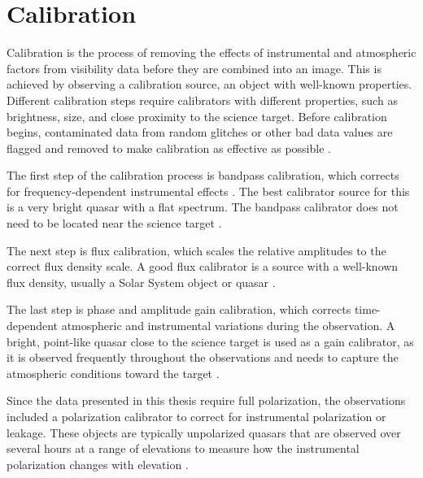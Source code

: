 


\section{Calibration}

Calibration is the process of removing the effects of instrumental and atmospheric factors from visibility data before they are combined into an image. This is achieved by observing a calibration source, an object with well-known properties. Different calibration steps require calibrators with different properties, such as brightness, size, and close proximity to the science target. Before calibration begins, contaminated data from random glitches or other bad data values are flagged and removed to make calibration as effective as possible \citep{Thompson}.



The first step of the calibration process is bandpass calibration, which corrects for frequency-dependent instrumental effects \citep{CASA2012,Ricci2017}. The best calibrator source for this is a very bright quasar with a flat spectrum. The bandpass calibrator does not need to be located near the science target \citep{Bendo2026}.


The next step is flux calibration, which scales the relative amplitudes to the correct flux density scale. A good flux calibrator is a source with a well-known flux density, usually a Solar System object or quasar \citep{Ricci2017}.


The last step is phase and amplitude gain calibration, which corrects time-dependent atmospheric and instrumental variations during the observation. A bright, point-like quasar close to the science target is used as a gain calibrator, as it is observed frequently throughout the observations and needs to capture the atmospheric conditions toward the target \citep{Ricci2017}. 




Since the data presented in this thesis require full polarization, the observations included a polarization calibrator to correct for instrumental polarization or leakage. These objects are typically unpolarized quasars that are observed over several hours at a range of elevations to measure how the instrumental polarization changes with elevation \citep{ALMATechnicalHandbook}.


